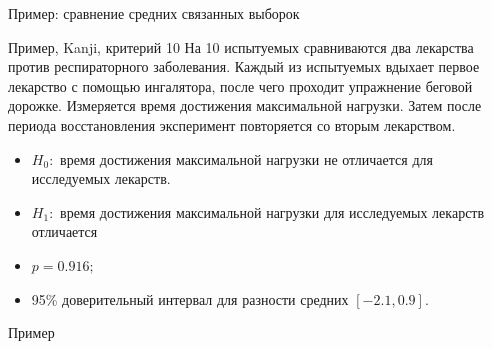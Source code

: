 \documentclass[11pt,pdf,utf8,hyperref={unicode},aspectratio=169]{beamer}
\begin{document}
\begin{frame}{Пример: сравнение средних связанных выборок}
    \begin{block}{Пример, Kanji, критерий 10}
    На 10 испытуемых сравниваются два лекарства против респираторного заболевания.
    Каждый из испытуемых вдыхает первое лекарство с помощью ингалятора, после чего проходит упражнение беговой дорожке.
    Измеряется время достижения максимальной нагрузки.
    Затем после периода восстановления эксперимент повторяется со вторым лекарством.
    \end{block}
    \bigskip
    \begin{itemize}
    \item $H_0\colon$ время достижения максимальной нагрузки не отличается для исследуемых лекарств.

    \item $H_1\colon$ время достижения максимальной нагрузки  для исследуемых лекарств отличается

     \item $p=0.916;$

     \item 95\% доверительный интервал для разности средних $\left[-2.1, 0.9\right].$
    \end{itemize}
\end{frame}

\begin{frame}{Пример}
\end{frame}
\end{document}
